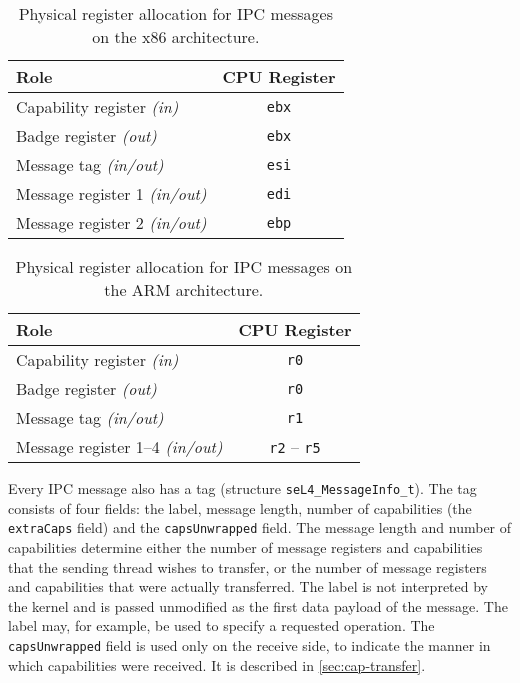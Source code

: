 \ifxeightsix
\begin{table}[htb]
    \begin{center}
        \begin{tabular}{lc}
            \toprule
            Role                                    & CPU Register \\
            \midrule
            Capability register \emph{(in)}         & \texttt{ebx} \\
            Badge register \emph{(out)}             & \texttt{ebx} \\
            Message tag \emph{(in/out)}     & \texttt{esi} \\
            Message register 1 \emph{(in/out)}      & \texttt{edi} \\
            Message register 2 \emph{(in/out)}      & \texttt{ebp} \\
            \bottomrule
        \end{tabular}
    \caption{\label{tbl:mrs_x86}Physical register allocation for IPC messages
    on the x86 architecture.}
    \end{center}
\end{table}
\fi

\begin{table}[htb]
    \begin{center}
        \begin{tabular}{lc}
            \toprule
            Role                                    & CPU Register \\
            \midrule
            Capability register \emph{(in)}         & \texttt{r0} \\
            Badge register \emph{(out)}             & \texttt{r0} \\
            Message tag \emph{(in/out)}     & \texttt{r1} \\
            Message register 1--4 \emph{(in/out)}   & \texttt{r2} -- \texttt{r5} \\
            \bottomrule
        \end{tabular}
    \caption{\label{tbl:mrs_arm}Physical register allocation for IPC messages on the ARM architecture.}
    \end{center}
\end{table}

Every IPC message also has a tag (structure \texttt{seL4\_MessageInfo\_t}).  The
tag consists of four fields: the label, message length, number of capabilities
(the \texttt{extraCaps} field) and the \texttt{capsUnwrapped} field.  The
message length and number of capabilities determine either the number of
message registers and capabilities that the sending thread wishes to transfer,
or the number of message registers and capabilities that were actually
transferred. The label is not interpreted by the
kernel and is passed unmodified as the first data payload of the message. The
label may, for example, be used to specify a requested operation. The
\texttt{capsUnwrapped} field is used only on the receive side, to indicate the
manner in which capabilities were received. It is described in
\autoref{sec:cap-transfer}.

